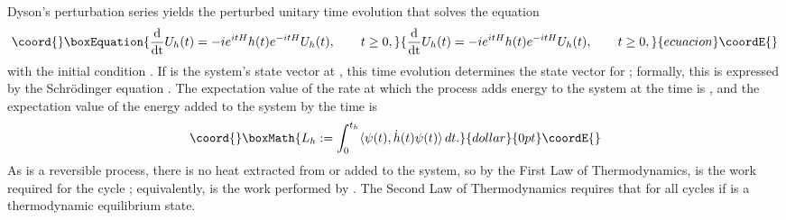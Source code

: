 \documentclass[a4paper,11pt]{article}
\def\gO{\Omega}
\def\go{\omega}
\def\ddt{\frac{{\rm d}}{{\rm dt}}}
\begin{document}
Dyson's perturbation series yields the perturbed unitary time evolution
\newline {}\coordHE{} that solves the equation
\begin{equation}\coord{}\boxEquation{\label{Dyson}
\ddt U_h(t)=-ie^{itH}h(t)e^{-itH}U_h(t),\qquad t\geq0,
}{\ddt U_h(t)=-ie^{itH}h(t)e^{-itH}U_h(t),\qquad t\geq0,
}{ecuacion}\coordE{}\end{equation}
with the initial condition \coordHE{}.
If \myHighlight{$\gO$}\coordHE{} is the system's state vector at \coordHE{}, this time
evolution determines the state vector \myHighlight{$\psi(t):=e^{-itH}U_h(t)\gO$}\coordHE{}
for \coordHE{};
formally, this is expressed by the Schr\"odinger equation
\myHighlight{$i\ddt\psi(t)=(H+h(t))\psi(t)$}\coordHE{}. The expectation value of the
rate at which the process \coordHE{} adds
energy to the system at the time \coordHE{}
is \coordHE{}, and
the expectation value of the energy added
to the system by the time \coordHE{} is
$$\coord{}\boxMath{L_h:=\int_0^{t_h}\langle\psi(t),
\dot{h}(t)\psi(t)\rangle\,dt.}{dollar}{0pt}\coordE{}$$
As \coordHE{} is a reversible process,
there is no heat extracted from or added to the
system, so by the First Law of Thermodynamics,
\coordHE{} is the work required for the cycle \coordHE{};
equivalently, \coordHE{} is the work performed
by \coordHE{}. The Second Law of Thermodynamics requires that
\coordHE{} for all cycles \coordHE{} if \myHighlight{$\go$}\coordHE{} is a
thermodynamic equilibrium state.
\end{document}
